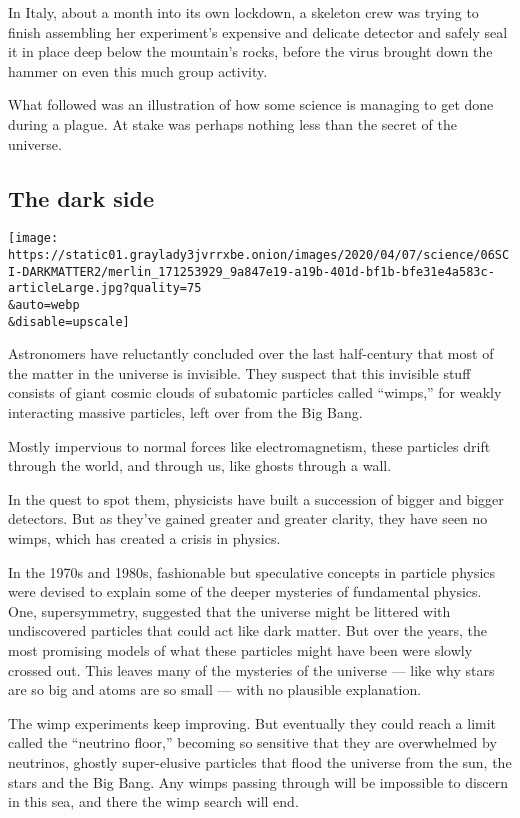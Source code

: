 In Italy, about a month into its own lockdown, a skeleton crew was
trying to finish assembling her experiment's expensive and delicate
detector and safely seal it in place deep below the mountain's rocks,
before the virus brought down the hammer on even this much group
activity.

What followed was an illustration of how some science is managing to get
done during a plague. At stake was perhaps nothing less than the secret
of the universe.

\hypertarget{the-dark-side}{%
\subsection{The dark side}\label{the-dark-side}}

\texttt{[image: https://static01.graylady3jvrrxbe.onion/images/2020/04/07/science/06SCI-DARKMATTER2/merlin\_171253929\_9a847e19-a19b-401d-bf1b-bfe31e4a583c-articleLarge.jpg?quality=75\\\&auto=webp\\\&disable=upscale]}

Astronomers have reluctantly concluded over the last half-century that
most of the matter in the universe is invisible. They suspect that this
invisible stuff consists of giant cosmic clouds of subatomic particles
called ``wimps,'' for weakly interacting massive particles, left over
from the Big Bang.

Mostly impervious to normal forces like electromagnetism, these
particles drift through the world, and through us, like ghosts through a
wall.

In the quest to spot them, physicists have built a succession of bigger
and bigger detectors. But as they've gained greater and greater clarity,
they have seen no wimps, which has created a crisis in physics.

In the 1970s and 1980s, fashionable but speculative concepts in particle
physics were devised to explain some of the deeper mysteries of
fundamental physics. One, supersymmetry, suggested that the universe
might be littered with undiscovered particles that could act like dark
matter. But over the years, the most promising models of what these
particles might have been were slowly crossed out. This leaves many of
the mysteries of the universe --- like why stars are so big and atoms
are so small --- with no plausible explanation.

The wimp experiments keep improving. But eventually they could reach a
limit called the ``neutrino floor,'' becoming so sensitive that they are
overwhelmed by neutrinos, ghostly super-elusive particles that flood the
universe from the sun, the stars and the Big Bang. Any wimps passing
through will be impossible to discern in this sea, and there the wimp
search will end.

